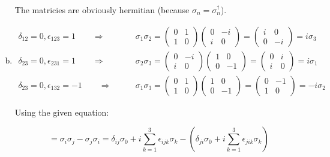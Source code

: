 \documentclass[a4paper,german,12pt,smallheadings]{scrartcl}
\begin{document}
\begin{enumerate}[a)]
    The matricies are obviously hermitian (because $\sigma_n = \sigma_n^\dagger$).
  \item
    \begin{align*}
      \delta_{12} = 0, \epsilon_{123} = 1 \qquad\Rightarrow\qquad
      &\sigma_1\sigma_2 =
      \begin{pmatrix} 0 & 1 \\ 1 & 0 \end{pmatrix}
      \begin{pmatrix} 0 & -i \\ i & 0 \end{pmatrix}
      =
      \begin{pmatrix} i & 0 \\ 0 & -i \end{pmatrix} = i\sigma_3 \\
      \delta_{23} = 0, \epsilon_{231} = 1 \qquad\Rightarrow\qquad
      &\sigma_2\sigma_3 =
      \begin{pmatrix} 0 & -i \\ i & 0 \end{pmatrix}
      \begin{pmatrix} 1 & 0 \\ 0 & -1\end{pmatrix}
      =
      \begin{pmatrix} 0 & i \\ i & 0\end{pmatrix} = i\sigma_1 \\
      \delta_{23} = 0, \epsilon_{132} = -1 \qquad\Rightarrow\qquad
      &\sigma_1\sigma_3 =
      \begin{pmatrix} 0 & 1 \\ 1 & 0 \end{pmatrix}
      \begin{pmatrix} 1 & 0 \\ 0 & -1\end{pmatrix}
      =
      \begin{pmatrix} 0 & -1 \\ 1 & 0\end{pmatrix}
      = -i\sigma_2
    \end{align*}

    Using the given equation:

    \begin{equation*}
      [\sigma_i, \sigma_j] = \sigma_i\sigma_j - \sigma_j\sigma_i =
      \delta_{ij}\sigma_0 + i \sum_{k=1}^3 \epsilon_{ijk} \sigma_k -
      \left(\delta_{ji}\sigma_0 + i \sum_{k=1}^3 \epsilon_{jik} \sigma_k\right)
    \end{equation*}


\end{enumerate}
\end{document}
